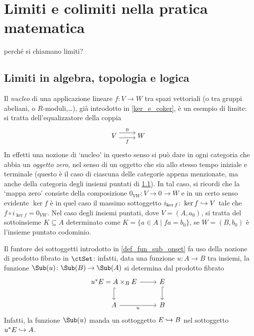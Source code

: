 \section{Limiti e colimiti nella pratica matematica}
perché si chiamano limiti?
\begin{remark}
\end{remark}
\subsection{Limiti in algebra, topologia e logica}
\begin{example}\label{ex_lim_kernel}
 Il \emph{nucleo} di una applicazione lineare \(f \colon V \to W\) tra spazi vettoriali (o tra gruppi abeliani, o \(R\)-moduli,\dots), già introdotto in \ref{ker_e_coker}, è un esempio di limite: si tratta dell'equalizzatore della coppia
 \[\begin{tikzcd}[cramped]
   V & W
   \arrow["0", shift left=2, from=1-1, to=1-2]
   \arrow["f"', shift right, from=1-1, to=1-2]
  \end{tikzcd}\]
 In effetti una nozione di `nucleo' in questo senso si può dare in ogni categoria che abbia un \emph{oggetto zero}, nel senso di un oggetto che sia allo stesso tempo iniziale e terminale (questo è il caso di ciascuna delle categorie appena menzionate, ma anche della categoria degli insiemi puntati di \ref{}). In tal caso, si ricordi che la `mappa zero' consiste della composizione \(0_{VW} \colon V \to 0 \to W\) e in un certo senso evidente \(\ker f\) è in quel caso il massimo sottoggetto \(i_{\ker f} \colon \ker f \hookrightarrow V\) tale che \(f\circ i_{\ker f} = 0_{VW}\). Nel caso degli insiemi puntati, dove \(V=(A,a_0)\), si tratta del sottoinsieme \(K\subseteq A\) determinato come \(K=\{a\in A\mid fa = b_0\}\), se \(W=(B,b_0)\) è l'insieme puntato codominio.
\end{example}
\begin{example}\label{exa_sottoggetti_limite}
 Il funtore dei sottoggetti introdotto in \ref{def_fun_sub_onset} fa uso della nozione di prodotto fibrato in \(\ctSet\): infatti, data una funzione \(u \colon A\to B\) tra insiemi, la funzione \(\Sub(u) \colon \Sub(B) \to \Sub(A)\) si determina dal prodotto fibrato
 \[\begin{tikzcd}
   u^*E =\pull AEB \arrow[r] \arrow[d, hook] & E \arrow[d, hook] \\
   A \arrow[r, "u"'] & B
  \end{tikzcd}\]
 Infatti, la funzione \(\Sub(u)\) manda un sottoggetto \(E\hookrightarrow B\) nel sottoggetto \(u^*E\hookrightarrow A\).
\end{example}

